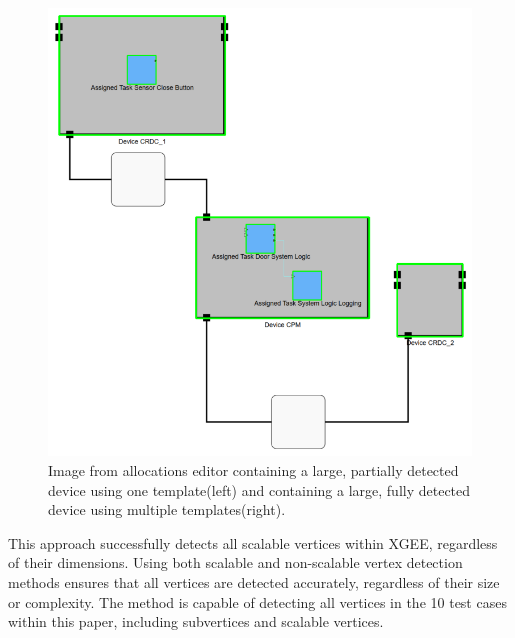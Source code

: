 \begin{figure}[htb]
\begin{minipage}[b]{0.36\textwidth}
        \includegraphics[width=\textwidth]{Pictures/many_templates_after.png}
    \end{minipage}
    \caption{Image from allocations editor containing a large, partially detected device using one template(left) and containing a large, fully detected device using multiple templates(right).}
    \label{fig_many_templates}
\end{figure}
This approach successfully detects all scalable vertices within XGEE, regardless of their dimensions. Using both scalable and non-scalable vertex detection methods ensures that all vertices are detected accurately, regardless of their size or complexity. The method is capable of detecting all vertices in the 10 test cases within this paper, including subvertices and scalable vertices.

